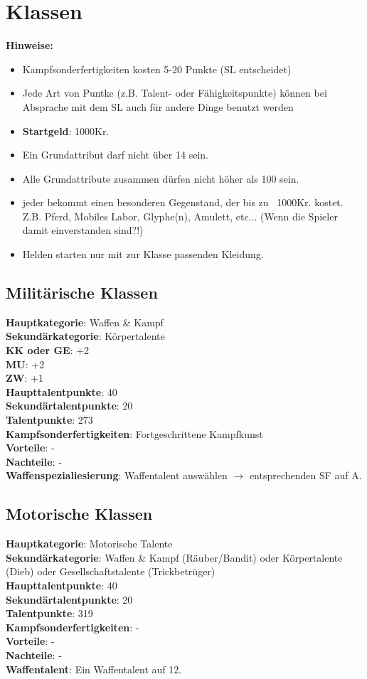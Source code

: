 {\let\clearpage\relax\chapter{Klassen}}
\textbf{Hinweise:}
\begin{itemize}
\item Kampfsonderfertigkeiten kosten 5-20 Punkte (SL entscheidet)
\item Jede Art von Puntke (z.B. Talent- oder Fähigkeitspunkte) können bei Absprache mit dem SL auch für andere Dinge benutzt werden
\item \textbf{Startgeld}: 1000Kr.
\item Ein Grundattribut darf nicht über 14 sein.
\item Alle Grundattribute zusammen dürfen nicht höher als 100 sein.
\item jeder bekommt einen besonderen Gegenstand, der bis zu ~1000Kr. kostet. Z.B. Pferd, Mobiles Labor, Glyphe(n), Amulett, etc... (Wenn die Spieler damit einverstanden sind?!)
\item Helden starten nur mit zur Klasse passenden Kleidung.
\end{itemize}


\section{Militärische Klassen}
\textbf{Hauptkategorie}: Waffen \& Kampf \\
\textbf{Sekundärkategorie}: Körpertalente \\
\textbf{KK oder GE}: +2 \\
\textbf{MU}: +2 \\
\textbf{ZW}: +1 \\
\textbf{Haupttalentpunkte}: 40 \\
\textbf{Sekundärtalentpunkte}: 20 \\
\textbf{Talentpunkte}: 273 \\
\textbf{Kampfsonderfertigkeiten}: Fortgeschrittene Kampfkunst \\
\textbf{Vorteile}: - \\
\textbf{Nachteile}: - \\
\textbf{Waffenspezialiesierung}: Waffentalent auswählen $\rightarrow$ entsprechenden SF auf A.


\section{Motorische Klassen}
\textbf{Hauptkategorie}: Motorische Talente \\
\textbf{Sekundärkategorie}: Waffen \& Kampf (Räuber/Bandit) oder Körpertalente (Dieb) oder Gesellschaftstalente (Trickbetrüger) \\
\textbf{Haupttalentpunkte}: 40 \\
\textbf{Sekundärtalentpunkte}: 20 \\
\textbf{Talentpunkte}: 319 \\
\textbf{Kampfsonderfertigkeiten}: - \\
\textbf{Vorteile}: - \\
\textbf{Nachteile}: - \\
\textbf{Waffentalent}: Ein Waffentalent auf 12.


